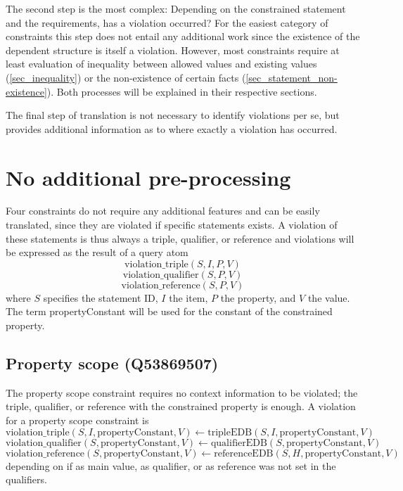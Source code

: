 \documentclass[hyperref,bachelorofscience,fleqn]{cgvpub}
\begin{document}
The second step is the most complex: Depending on the constrained statement and the requirements, has a violation occurred? For the easiest category of constraints this step does not entail any additional work since the existence of the dependent structure is itself a violation. However, most constraints require at least evaluation of inequality between allowed values and existing values (\ref{sec_inequality}) or the non-existence of certain facts (\ref{sec_statement_non-existence}). Both processes will be explained in their respective sections.

The final step of translation is not necessary to identify violations per se, but provides additional information as to where exactly a violation has occurred. 

\section{No additional pre-processing}\label{sec_no_preprocessing}
Four constraints do not require any additional features and can be easily translated, since they are violated if specific statements exists. A violation of these statements is thus always a triple, qualifier, or reference and violations will be expressed as the result of a query atom
\[\text{violation\_triple}(S, I, P, V)\]
\[\text{violation\_qualifier}(S, P, V)\]
\[\text{violation\_reference}(S, P, V)\]
where \(S\) specifies the statement ID, \(I\) the item, \(P\) the property, and \(V\) the value. The term propertyConstant will be used for the constant of the constrained property.

\subsection{Property scope (Q53869507)}
The property scope constraint requires no context information to be violated; the triple, qualifier, or reference with the constrained property is enough.
A violation for a property scope constraint is
\[\text{violation\_triple}(S, I, \text{propertyConstant}, V) \leftarrow \text{tripleEDB}(S, I, \text{propertyConstant}, V)\]
\[\text{violation\_qualifier}(S, \text{propertyConstant}, V) \leftarrow \text{qualifierEDB}(S, \text{propertyConstant}, V)\]
\[\text{violation\_reference}(S, \text{propertyConstant}, V) \leftarrow \text{referenceEDB}(S, H, \text{propertyConstant}, V)\]
depending on if as main value, as qualifier, or as reference was not set in the qualifiers.\\
\end{document}

